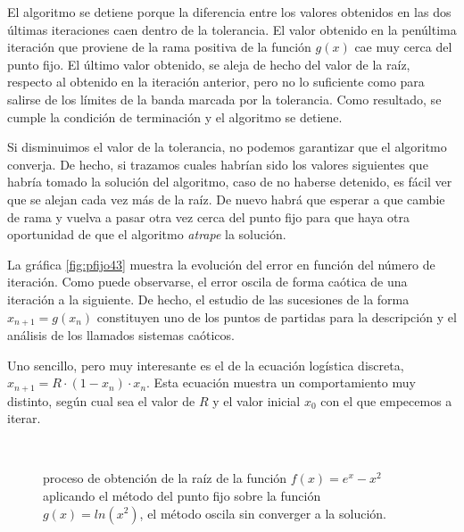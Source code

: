  El algoritmo se detiene porque la diferencia entre los valores obtenidos en las dos últimas iteraciones caen dentro de la tolerancia. El valor obtenido en la penúltima iteración que proviene de la rama positiva de la función $g(x)$ cae muy cerca del punto fijo. El último valor obtenido, se aleja de hecho del valor de la raíz, respecto al obtenido en la iteración anterior, pero no lo suficiente como para salirse de los límites de la banda marcada por la tolerancia. Como resultado, se cumple la condición de terminación y el algoritmo se detiene.  
 
 Si disminuimos el valor de la tolerancia, no podemos garantizar que el algoritmo converja. De hecho, si trazamos cuales habrían sido los valores siguientes que habría tomado la solución del algoritmo, caso de no haberse detenido, es fácil ver que se alejan cada vez más de la raíz.  De nuevo habrá que esperar a que cambie de rama y vuelva  a pasar otra vez cerca del punto fijo para que haya otra oportunidad de que el algoritmo \emph{atrape} la solución.
 
  La gráfica \ref{fig:pfijo43} muestra la evolución del error en función del número de iteración. Como puede observarse, el error oscila de forma caótica de una iteración a la siguiente. De hecho, el estudio de las sucesiones de la forma $x_{n+1}=g(x_n)$ constituyen uno de los puntos de partidas para la descripción y el análisis de los llamados sistemas caóticos. 

Uno sencillo, pero muy interesante es el de la ecuación logística discreta, $x_{n+1}=R\cdot (1-x_n)\cdot x_n$. Esta ecuación muestra un comportamiento muy distinto, según cual sea el valor de $R$ y el valor inicial $x_0$ con el que empecemos a iterar.
 
 

\begin{figure}[h]
\centering
{} \qquad
{}\\

\caption{proceso de obtención de la raíz de la función $f(x)=e^x-x^2$ aplicando el método del punto fijo sobre la función $g(x)=ln(x^2)$, el método oscila sin converger a la solución.}
\label{fig:pfijo4}
\end{figure}

